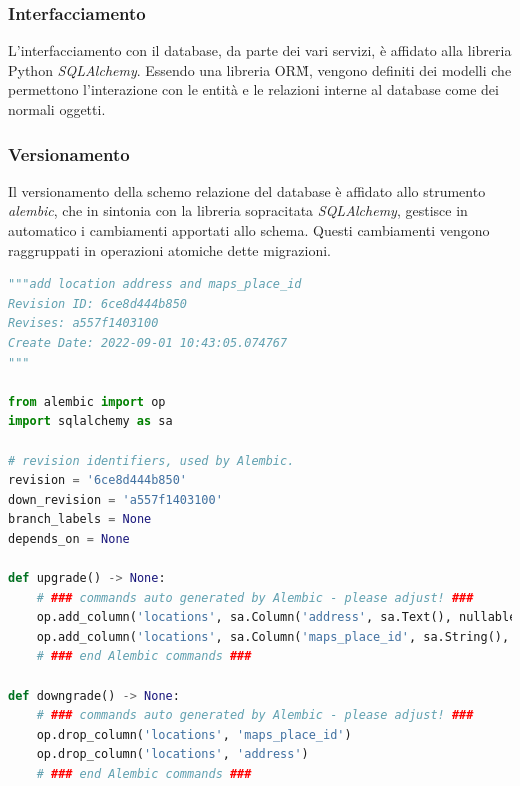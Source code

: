 \subsubsection{Interfacciamento}
L'interfacciamento con il database, da parte dei vari servizi, è affidato alla libreria Python \textit{SQLAlchemy}.
Essendo una libreria ORM\G{}, vengono definiti dei modelli che permettono l'interazione con le entità e le relazioni
interne al database come dei normali oggetti.

\subsubsection{Versionamento}
Il versionamento della schemo relazione del database è affidato allo strumento \textit{alembic}, che in
sintonia con la libreria sopracitata \textit{SQLAlchemy}, gestisce in automatico i cambiamenti apportati allo schema.
Questi cambiamenti vengono raggruppati in operazioni atomiche dette migrazioni.

\begin{lstlisting}[language=Python, caption=Esempio di migrazione autogenerata]
"""add location address and maps_place_id
Revision ID: 6ce8d444b850
Revises: a557f1403100
Create Date: 2022-09-01 10:43:05.074767
"""

from alembic import op
import sqlalchemy as sa

# revision identifiers, used by Alembic.
revision = '6ce8d444b850'
down_revision = 'a557f1403100'
branch_labels = None
depends_on = None

def upgrade() -> None:
    # ### commands auto generated by Alembic - please adjust! ###
    op.add_column('locations', sa.Column('address', sa.Text(), nullable=True))
    op.add_column('locations', sa.Column('maps_place_id', sa.String(), nullable=True))
    # ### end Alembic commands ###

def downgrade() -> None:
    # ### commands auto generated by Alembic - please adjust! ###
    op.drop_column('locations', 'maps_place_id')
    op.drop_column('locations', 'address')
    # ### end Alembic commands ###
\end{lstlisting}
